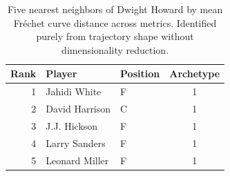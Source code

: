 \begin{table}[htbp]
  \centering\small
  \begin{tabular}{rllc}
    \toprule
    Rank & Player & Position & Archetype \\
    \midrule
    1 & Jahidi White & F & 1 \\
    2 & David Harrison & C & 1 \\
    3 & J.J. Hickson & F & 1 \\
    4 & Larry Sanders & F & 1 \\
    5 & Leonard Miller & F & 1 \\
    \bottomrule
  \end{tabular}
  \caption{Five nearest neighbors of Dwight Howard by mean Fr\'{e}chet curve distance across metrics. Identified purely from trajectory shape without dimensionality reduction.}
  \label{tab:Dwight_Howard_frechet_curve_neighbors}
\end{table}

